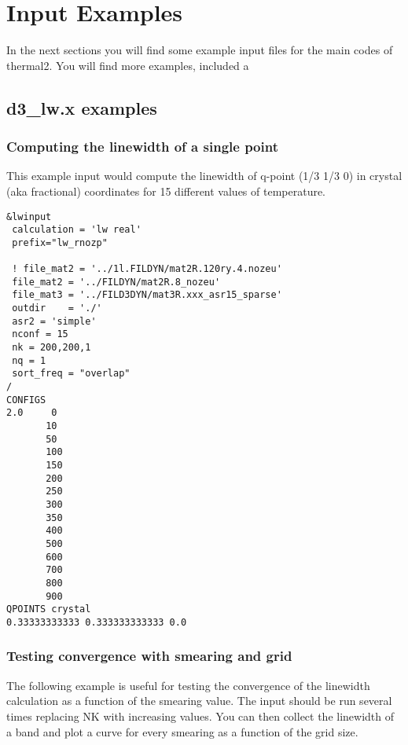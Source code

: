\documentclass[
]{article}
\begin{document}
\hypertarget{input-examples}{%
\section{Input Examples}\label{input-examples}}

In the next sections you will find some example input files for the main
codes of thermal2. You will find more examples, included a

\hypertarget{d3_lw.x-examples}{%
\subsection{d3\_lw.x examples}\label{d3_lw.x-examples}}

\hypertarget{computing-the-linewidth-of-a-single-point}{%
\subsubsection{Computing the linewidth of a single
point}\label{computing-the-linewidth-of-a-single-point}}

This example input would compute the linewidth of q-point (1/3 1/3 0) in
crystal (aka fractional) coordinates for 15 different values of
temperature.

\begin{verbatim}
&lwinput 
 calculation = 'lw real' 
 prefix="lw_rnozp" 

 ! file_mat2 = '../1l.FILDYN/mat2R.120ry.4.nozeu' 
 file_mat2 = '../FILDYN/mat2R.8_nozeu' 
 file_mat3 = '../FILD3DYN/mat3R.xxx_asr15_sparse' 
 outdir    = './' 
 asr2 = 'simple' 
 nconf = 15
 nk = 200,200,1 
 nq = 1
 sort_freq = "overlap"
/ 
CONFIGS 
2.0     0 
       10 
       50 
       100 
       150 
       200 
       250 
       300 
       350 
       400 
       500 
       600 
       700 
       800 
       900 
QPOINTS crystal 
0.33333333333 0.333333333333 0.0
\end{verbatim}

\hypertarget{testing-convergence-with-smearing-and-grid}{%
\subsubsection{Testing convergence with smearing and
grid}\label{testing-convergence-with-smearing-and-grid}}

The following example is useful for testing the convergence of the
linewidth calculation as a function of the smearing value. The input
should be run several times replacing NK with increasing values. You can
then collect the linewidth of a band and plot a curve for every smearing
as a function of the grid size.
\end{document}
